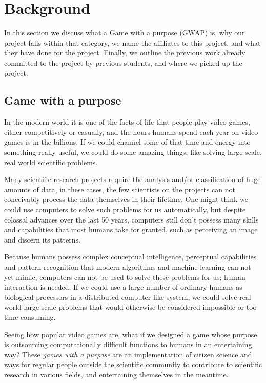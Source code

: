 \section{Background}\label{sec:background}
	In this section we discuss what a Game with a purpose (GWAP) \cite{GWAP} is, why our project falls within that category, we name the affiliates to this project, and what they have done for the project. Finally, we outline the previous work already committed to the project by previous students, and where we picked up the project.

\subsection{Game with a purpose}
	In the modern world it is one of the facts of life that people play video games, either competitively or casually, and the hours humans spend each year on video games is in the billions. If we could channel some of that time and energy into something really useful, we could do some amazing things, like solving large scale, real world scientific problems.

	Many scientific research projects require the analysis and/or classification of huge amounts of data, in these cases, the few scientists on the projects can not conceivably process the data themselves in their lifetime. One might think we could use computers to solve such problems for us automatically, but despite colossal advances over the last 50 years, computers still don't possess many skills and capabilities that most humans take for granted, such as perceiving an image and discern its patterns.

	Because humans possess complex conceptual intelligence, perceptual capabilities and pattern recognition that modern algorithms and machine learning can not yet mimic, computers can not be used to solve these problems for us; human interaction is needed. If we could use a large number of ordinary humans as biological processors in a distributed computer-like system, we could solve real world large scale problems that would otherwise be considered impossible or too time consuming.

	Seeing how popular video games are, what if we designed a game whose purpose is outsourcing computationally difficult functions to humans in an entertaining way? These \emph{games with a purpose} are an implementation of citizen science and ways for regular people outside the scientific community to contribute to scientific research in various fields, and entertaining themselves in the meantime.

